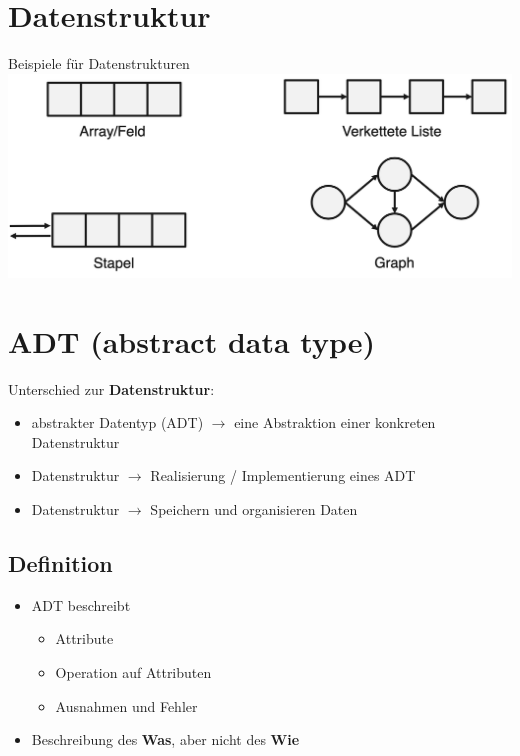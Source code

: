 \documentclass[a4paper, landscape, 8pt]{scrartcl}
\begin{document}
\begin{multicols*}{4}
            \section{Datenstruktur}
                \textcolor{subsectioncolor}{Beispiele für Datenstrukturen}
                \newline
                \includegraphics[scale=0.12]{graphic/06_adt_beispiele}

            \columnbreak

            \section{ADT (abstract data type)}
            Unterschied zur {\bfseries Datenstruktur}:
            \begin{itemize}
                \item abstrakter Datentyp (ADT) $\to$ eine Abstraktion einer konkreten Datenstruktur
                \item Datenstruktur $\to$ Realisierung / Implementierung eines ADT
                \item Datenstruktur $\to$ Speichern und organisieren Daten
            \end{itemize}
            \subsection{Definition}
                \begin{itemize}
                    \item ADT beschreibt
                    \begin{itemize}
                        \item Attribute
                        \item Operation auf Attributen
                        \item Ausnahmen und Fehler
                    \end{itemize}
                    \item Beschreibung des {\bfseries Was}, aber nicht des {\bfseries Wie}
                \end{itemize}


\end{multicols*}
\end{document}
